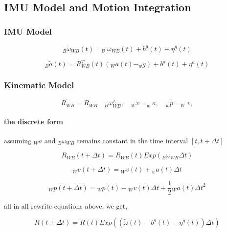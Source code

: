 \documentclass[10pt,a4paper]{article}
\begin{document}
\subsection{IMU Model and Motion Integration}

\subsubsection{IMU Model}
\begin{equation}
	_{B}\tilde{\omega}_{WB}(t) = _{B}\omega_{WB}(t) + b^g(t) + \eta^g(t)
\end{equation}

\begin{equation}
_B\tilde{a}(t) = R^T_{WB}(t)(_Wa(t) - _wg) + b^a(t) + \eta^a(t)
\end{equation}

\subsubsection{Kinematic Model}
\begin{equation}
\dot{R_{WB}} = R_{WB}\quad {_B}\omega_{WB}^{\wedge}, \quad _W\dot{v} = _wa, \quad _w\dot{p}=_Wv,
\end{equation}

\paragraph{the discrete form}
assuming ${_W}a$ and $_B\omega_{WB}$ remains constant in the time interval ${[t, {t+\Delta t}]}$

\begin{equation}
R_{WB}(t+\Delta t) = R_{WB}(t) Exp(_B \omega_{WB} \Delta t)
\end{equation}

\begin{equation}
{_W}v(t+\Delta t) = {_W}v(t) + {_w}a(t)\Delta t
\end{equation}

\begin{equation}
{_W}p(t+\Delta t) = {_W}p(t) + {_W}v(t)\Delta t + \frac{1}{2} {_W}a(t) {\Delta t}^2
\end{equation}

all in all rewrite equations above, we get,

\begin{equation}
R(t+\Delta t) = R(t) Exp(( \tilde{\omega}(t) - b^g(t) - \eta^g(t)) \Delta t)
\end{equation}
\end{document}
